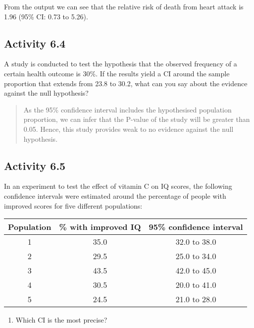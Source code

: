 \documentclass[
]{memoir}
\providecommand{\tightlist}{%
  \setlength{\itemsep}{0pt}\setlength{\parskip}{0pt}}
\begin{document}
From the output we can see that the relative risk of death from heart attack is 1.96 (95\% CI: 0.73 to 5.26).

\hypertarget{activity-6.4}{%
\subsection*{Activity 6.4}\label{activity-6.4}}

A study is conducted to test the hypothesis that the observed frequency of a certain health outcome is 30\%. If the results yield a CI around the sample proportion that extends from 23.8 to 30.2, what can you say about the evidence against the null hypothesis?

\begin{quote}
As the 95\% confidence interval includes the hypothesised population proportion, we can infer that the P-value of the study will be greater than 0.05. Hence, this study provides weak to no evidence against the null hypothesis.
\end{quote}

\hypertarget{activity-6.5}{%
\subsection*{Activity 6.5}\label{activity-6.5}}

In an experiment to test the effect of vitamin C on IQ scores, the following confidence intervals were estimated around the percentage of people with improved scores for five different populations:

\begin{longtable}[]{@{}ccc@{}}
\toprule()
Population & \% with improved IQ & 95\% confidence interval \\
\midrule()
\endhead
1 & 35.0 & 32.0 to 38.0 \\
2 & 29.5 & 25.0 to 34.0 \\
3 & 43.5 & 42.0 to 45.0 \\
4 & 30.5 & 20.0 to 41.0 \\
5 & 24.5 & 21.0 to 28.0 \\
\bottomrule()
\end{longtable}

\begin{enumerate}
\def\labelenumi{\alph{enumi})}
\tightlist
\item
  Which CI is the most precise?
\end{enumerate}
\end{document}
